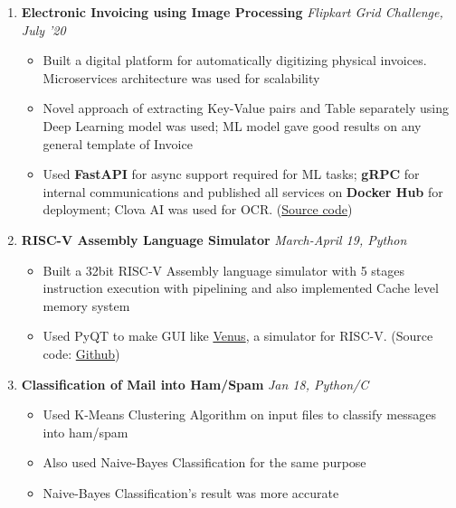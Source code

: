 \documentclass[a4paper,12pt]{awesome}
\begin{document}
\begin{enumerate}
    \item \textbf{Electronic Invoicing using Image Processing}
        \hfill \emph{Flipkart Grid Challenge, July '20}\\[-0.6cm]
        \begin{itemize}
            \item Built a digital platform for automatically digitizing physical invoices. 
            Microservices architecture was used for scalability
            \item Novel approach of extracting Key-Value pairs and Table separately using
            Deep Learning model was used; ML model gave good results on any general template of Invoice
            \item Used \textbf{FastAPI} for async support required for ML tasks; \textbf{gRPC} for internal communications 
            and published all services on \textbf{Docker Hub} for deployment; Clova AI was used for OCR. 
            (\href{https://docs.google.com/document/d/1X1sg_pPHy_magULwscUbH0_RvUvilRWutCnh3Fi92Cc/view}{Source code})
        \end{itemize}
    \item \textbf{RISC-V Assembly Language Simulator}
        \hfill \emph{March-April 19, Python}\\[-0.6cm]
        \begin{itemize}
            \item Built a 32bit RISC-V Assembly language simulator with 5 stages instruction execution 
                with pipelining and also implemented Cache level memory system
            \item Used PyQT to make GUI like \href{http://www.kvakil.me/venus/}{Venus}, 
                a simulator for RISC-V. (Source code: \href{https://github.com/dilip640/RISC-V-Simulator}{Github})
        \end{itemize}
    \item \textbf{Classification of Mail into Ham/Spam}
        \hfill  \emph{ Jan 18, Python/C} \\[-0.6cm]
        \begin{itemize}
            \item Used K-Means Clustering Algorithm on input files to classify messages into ham/spam
            \item Also used Naive-Bayes Classification for the same purpose
            \item Naive-Bayes Classification's result was more accurate

\end{itemize}
\end{enumerate}
\end{document}
